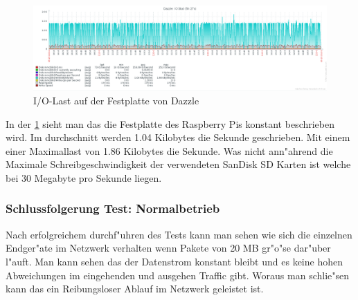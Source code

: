 \begin{figure}[htbp]
\centering
\includegraphics*[width=0.9\linewidth]{Abb/ZabbixDazzle/Standard/IoStatDazzleStandard}

\caption{I/O-Last auf der Festplatte von Dazzle}
\label{fig:IoStatDazzleStandard}
\end{figure}

In der \cref{fig:IoStatDazzleStandard} sieht man das die Festplatte des Raspberry Pis konstant beschrieben wird. Im durchschnitt werden 1.04 Kilobytes %
die Sekunde geschrieben. Mit einem einer Maximallast von 1.86 Kilobytes die Sekunde. Was nicht ann"ahrend die Maximale Schreibgeschwindigkeit der verwendeten %
SanDisk SD Karten ist welche bei 30 Megabyte\autocite{san:sd} pro Sekunde liegen. 

\subsubsection{Schlussfolgerung Test: Normalbetrieb}
\label{subsubsec:schlussfolgerung:normalbetrieb}
Nach erfolgreichem durchf"uhren des Tests kann man sehen wie sich die einzelnen Endger"ate im Netzwerk verhalten wenn Pakete von 20 MB gr"o"se dar"uber l"auft. %
Man kann sehen das der Datenstrom konstant bleibt und es keine hohen Abweichungen im eingehenden und ausgehen Traffic gibt. Woraus man schlie"sen kann das %
ein Reibungsloser Ablauf im Netzwerk geleistet ist. 



